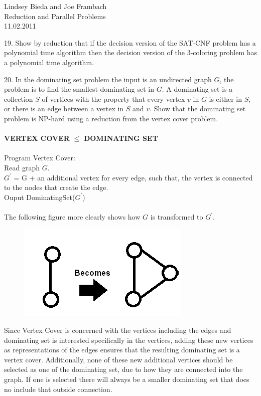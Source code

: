 \documentclass[10pt]{article}
\newcommand{\tab}{\hspace*{2em}}
\begin{document}
	\begin{flushright}
	Lindsey Bieda and Joe Frambach\\
	Reduction and Parallel Problems\\
	11.02.2011
	\end{flushright}
19. Show by reduction that if the decision version of the SAT-CNF problem has a polynomial time algorithm
then the decision version of the 3-coloring problem has a polynomial time algorithm.
\newpage

20. In the dominating set problem the input is an undirected graph $G$, the problem is to find the smallest
dominating set in $G$. A dominating set is a collection $S$ of vertices with the property that every vertex
$v$ in $G$ is either in $S$, or there is an edge between a vertex in $S$ and $v$. Show that the dominating set
problem is NP-hard using a reduction from the vertex cover problem.\\
\\
\textbf{VERTEX COVER} $\leq$ \textbf{DOMINATING SET}\\
\\
Program Vertex Cover:\\
\tab Read graph $G$.\\
\tab $G^\prime$ = G + an additional vertex for every edge, such that, the vertex is connected to the nodes that create the edge.\\
\tab Ouput DominatingSet($G^\prime$)\\
\\
The following figure more clearly shows how $G$ is transformed to $G^\prime$. 
\begin{figure}[h]
	\centering
		\includegraphics{red20.png}
	\label{fig:red20}
\end{figure}
Since Vertex Cover is concerned with the vertices including the edges and dominating set is interested specifically in the vertices,
adding these new vertices as representations of the edges ensures that the resulting dominating set is a vertex cover. Additionally,
none of these new additional vertices should be selected as one of the dominating set, due to how they are connected into the graph. 
If one is selected there will always be a smaller dominating set that does no include that outside connection. 
\end{document}
